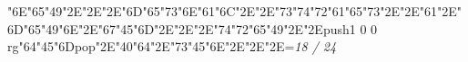 \null\vfill\ipa\char"6E\ipa\char"65\ipa\char"49\ipa\char"2E\quad\quad\quad\quad\ipa\char"2E\quad\ipa\char"2E\ipa\char"6D\ipa\char"65\ipa\char"73\bigskip\ipa\char"6E\ipa\char"61\ipa\char"6C\ipa\char"2E\quad\quad\quad\ipa\char"2E\ipa\char"73\ipa\char"74\ipa\char"72\ipa\char"61\ipa\char"65\ipa\char"73\bigskip\quad\quad\ipa\char"2E\quad\quad\quad\quad\ipa\char"2E\ipa\char"61\ipa\char"2E\ipa\char"6D\ipa\char"65\ipa\char"49\ipa\char"6E\ipa\char"2E\ipa\char"67\ipa\char"45\ipa\char"6D\ipa\char"2E\quad\quad\quad\quad\ipa\char"2E\quad\quad\quad\bigskip\quad\ipa\char"2E\ipa\char"74\ipa\char"72\ipa\char"65\ipa\char"49\ipa\char"2E\quad\quad\ipa\char"2E\pdfcolorstack\match push{1 0 0 rg}\ipa\char"64\ipa\char"45\ipa\char"6D\pdfcolorstack\match pop{}\ipa\char"2E\ipa\char"40\ipa\char"64\ipa\char"2E\quad\quad\quad\quad\quad\quad\bigskip\ipa\char"73\ipa\char"45\ipa\char"6E\ipa\char"2E\quad\quad\ipa\char"2E\quad\quad\quad\ipa\char"2E\quad\quad\quad\bigskip\vfill\footline={\hfill\tenrm\it 18 / 24}\eject\bye